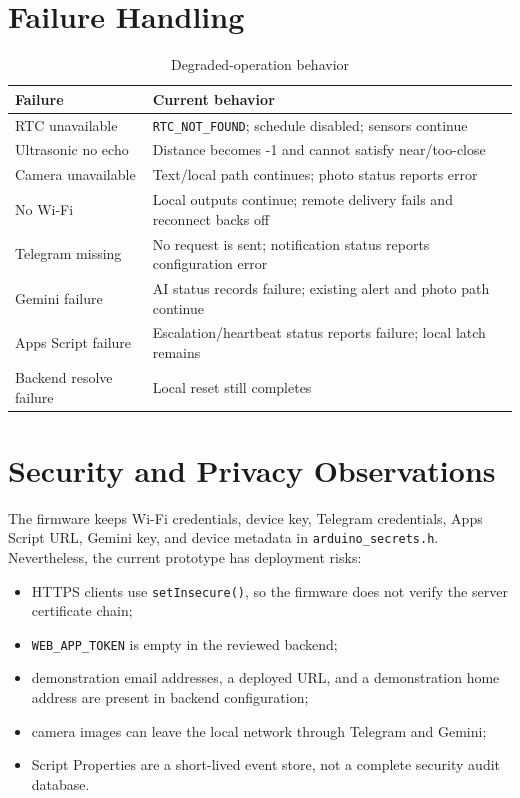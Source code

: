 \documentclass[11pt,a4paper]{report}
\begin{document}
\section{Failure Handling}
\begin{table}[H]
\centering
\caption{Degraded-operation behavior}
\begin{tabularx}{\textwidth}{p{3.2cm}X}
\toprule
\textbf{Failure} & \textbf{Current behavior}\\
\midrule
RTC unavailable & \texttt{RTC\_NOT\_FOUND}; schedule disabled; sensors continue\\
Ultrasonic no echo & Distance becomes -1 and cannot satisfy near/too-close\\
Camera unavailable & Text/local path continues; photo status reports error\\
No Wi-Fi & Local outputs continue; remote delivery fails and reconnect backs off\\
Telegram missing & No request is sent; notification status reports configuration error\\
Gemini failure & AI status records failure; existing alert and photo path continue\\
Apps Script failure & Escalation/heartbeat status reports failure; local latch remains\\
Backend resolve failure & Local reset still completes\\
\bottomrule
\end{tabularx}
\end{table}

\section{Security and Privacy Observations}
The firmware keeps Wi-Fi credentials, device key, Telegram credentials, Apps
Script URL, Gemini key, and device metadata in
\texttt{arduino\_secrets.h}. Nevertheless, the current prototype has
deployment risks:
\begin{itemize}
  \item HTTPS clients use \texttt{setInsecure()}, so the firmware does not
        verify the server certificate chain;
  \item \texttt{WEB\_APP\_TOKEN} is empty in the reviewed backend;
  \item demonstration email addresses, a deployed URL, and a demonstration
        home address are present in backend configuration;
  \item camera images can leave the local network through Telegram and Gemini;
  \item Script Properties are a short-lived event store, not a complete
        security audit database.
\end{itemize}
\end{document}
